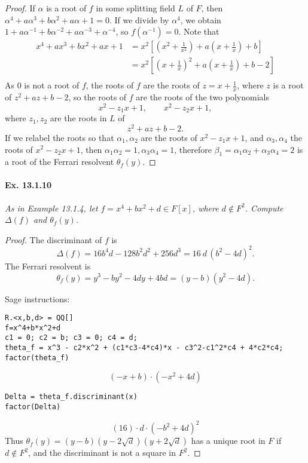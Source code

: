 \documentclass[11pt,a4paper]{article}
\begin{document}
\begin{proof}
If $\alpha$ is a root of $f$ in some splitting field $L$ of $F$, then $ \alpha^4+a\alpha^3+b\alpha^2+a\alpha+1 = 0$. If we divide by $\alpha^4$, we obtain
$1 + a \alpha^{-1} + b \alpha^{-2} + a\alpha^{-3} + \alpha^{-4}$, so $f(\alpha^{-1})=0$.
Note that
\begin{align*}
x^4+ax^3+bx^2+ax+1 &= x^2\left[ \left(x^2+\frac{1}{x^2} \right) + a \left( x + \frac{1}{x} \right) + b \right]\\
&=x^2\left[ \left(x+\frac{1}{x} \right)^2 + a \left( x + \frac{1}{x} \right) + b -2 \right]\\
\end{align*}
As $0$ is not a root of $f$, the roots of $f$ are the roots of  $z = x+\frac{1}{x}$, where $z$ is a root of $z^2+az+b-2$, so the roots of $f$ are the roots of the two polynomials
$$x^2-z_1x+1,\qquad x^2 -z_2x+1,$$
where $z_1,z_2$ are the roots in $L$ of
$$z^2+az+b-2.$$
If we relabel the roots so that $\alpha_1,\alpha_2$ are the roots of $x^2-z_1x+1$, and $\alpha_3,\alpha_4$ the roots of $x^2 -z_2x+1$, then $\alpha_1\alpha_2 = 1, \alpha_3\alpha_4 = 1$,
therefore $\beta_1 = \alpha_1\alpha_2+ \alpha_3\alpha_4 = 2$ is a root of the Ferrari resolvent $\theta_f(y)$.
\end{proof}

\paragraph{Ex. 13.1.10}

{\it As in Example 13.1.4, let $f=x^4+bx^2+d \in F[x]$, where $d \not \in F^2$. Compute $\Delta(f)$ and $\theta_f(y)$.
}

\begin{proof}
The discriminant of $f$ is
$$\Delta(f) =  16 b^{4} d - 128 b^{2} d^{2} + 256 d^{3} = 16\  d\,  ( b^{2} - 4 d)^{2}.$$
The Ferrari resolvent is
$$\theta_f(y) = y^3-by^2-4dy+4bd = (y-b)(y^2-4d).$$

Sage instructions:
\begin{verbatim}
R.<x,b,d> = QQ[]
f=x^4+b*x^2+d
c1 = 0; c2 = b; c3 = 0; c4 = d;
theta_f = x^3 - c2*x^2 + (c1*c3-4*c4)*x - c3^2-c1^2*c4 + 4*c2*c4;
factor(theta_f)
\end{verbatim}
$$(- x + b) \cdot (- x^{2} + 4 d)$$
\begin{verbatim}
Delta = theta_f.discriminant(x)
factor(Delta)
\end{verbatim}
$$	
\left(16\right) \cdot d \cdot (- b^{2} + 4 d)^{2}
$$
Thus $\theta_f(y) = (y-b)(y - 2\sqrt{d})(y+2\sqrt{d})$ has a unique root in $F$ if $d \not \in F^2$, and the discriminant is not a square in $F^2$.
\end{proof}
\end{document}
